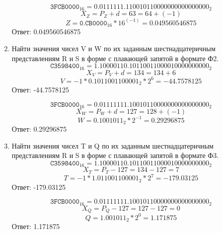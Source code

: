 \documentclass{article}
\begin{document}
\begin{enumerate}
            $$ 
                  \texttt{3FCB0000}_{16} =
                  0.0111111.110010110000000000000000_2
            $$
            $$ X_Z = P_Z + d = 63 = 64 + (-1) $$
            $$ Z = \texttt{0.CB0000}_{16} * 16^{(-1)} = 0.049560546875 $$
            Ответ: 0.049560546875
      \item Найти значения чисел V и W по их заданным шестнадцатеричным представлениям R и S в форме с плавающей запятой в формате Ф2.
            $$ 
                  \texttt{C3598400}_{16} =
                  1.10000110.10110011000010000000000_2
            $$
            $$ X_V = P_V + d = 134 = 134 + 6 $$
            $$ V = -1 * 0.1011001100001_{2} * 2^6 = -44.7578125 $$
            Ответ: -44.7578125
            
            $$ 
                  \texttt{3FCB0000}_{16} =
                  0.01111111.10010110000000000000000_2
            $$
            $$ X_W = P_W + d = 127 = 128 + (-1) $$
            $$ W = 0.1001011_{2} * 2^{-1} = 0.29296875 $$
            Ответ: 0.29296875
      \item Найти значения чисел T и Q по их заданным шестнадцатеричным представлениям R и S в форме с плавающей запятой в формате Ф3.
            $$ 
                  \texttt{C3598400}_{16} =
                  1.10000110.10110011000010000000000_2
            $$
            $$ X_T = P_T - 127 = 134 - 127 = 7 $$
            $$ T = -1 * 1.011001100001_{2} * 2^7 = -179.03125 $$
            Ответ: -179.03125
            
            $$ 
                  \texttt{3FCB0000}_{16} =
                  0.01111111.10010110000000000000000_2
            $$
            $$ X_Q = P_Q - 127 = 127 - 127 = 0 $$
            $$ Q = 1.001011_{2} * 2^0 = 1.171875 $$
            Ответ: 1.171875
\end{enumerate}
\end{document}
